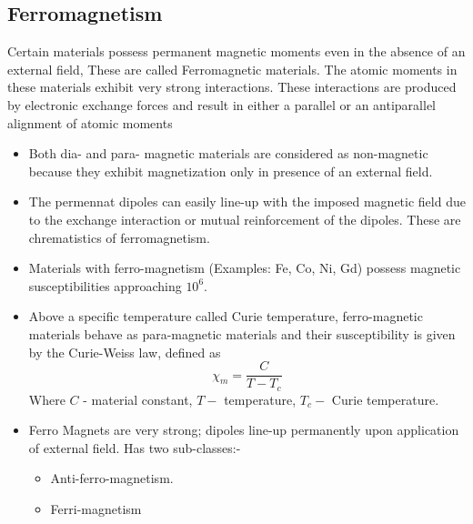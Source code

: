 \subsection{Ferromagnetism} 
Certain materials possess permanent magnetic moments even in the absence of an external field, These are called Ferromagnetic materials.
The atomic moments in these materials exhibit very strong interactions. These interactions are produced by electronic exchange forces and result in either a parallel or an antiparallel alignment of atomic moments 
\begin{itemize}
	\item  Both dia- and para- magnetic materials are considered as non-magnetic because they exhibit magnetization only in presence of an external field.

\item  The permennat dipoles can easily line-up with the imposed magnetic field due to the exchange interaction or mutual reinforcement of the dipoles. These are chrematistics of ferromagnetism.
\item  Materials with ferro-magnetism (Examples: Fe, Co, Ni, Gd) possess magnetic susceptibilities approaching $10^{6}$.
	\item  Above a specific temperature called Curie temperature, ferro-magnetic materials behave as para-magnetic materials and their susceptibility is given by the Curie-Weiss law, defined as
	$$
	\chi_{m}=\frac{C}{T-T_{c}}
	$$
	 Where $C$ - material constant, $T-$ temperature, $T_{c}-$ Curie temperature.
	\item  Ferro Magnets are very strong; dipoles line-up permanently upon application of external field. Has two sub-classes:-
	\begin{itemize}
		\item Anti-ferro-magnetism.
		\item  Ferri-magnetism
	\end{itemize}
	
\end{itemize}
